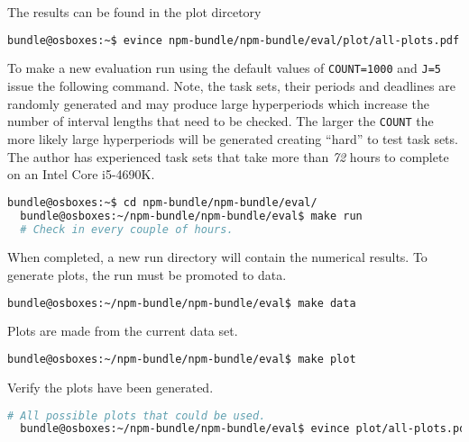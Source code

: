 \documentclass[a4paper]{article}
\begin{document}
{\noindent}The results can be found in the plot dircetory
\begin{lstlisting}[language=bash]
  bundle@osboxes:~$ evince npm-bundle/npm-bundle/eval/plot/all-plots.pdf
\end{lstlisting}

{\noindent}To make a new evaluation run using the default values of
\texttt{COUNT=1000} and \texttt{J=5} issue the following
command. Note, the task sets, their periods and deadlines are randomly
generated and may produce large hyperperiods which increase the number
of interval lengths that need to be checked. The larger the
\texttt{COUNT} the more likely large hyperperiods will be generated
creating ``hard'' to test task sets. The author has experienced task
sets that take more than \emph{72} hours to complete on an Intel Core i5-4690K.

\begin{lstlisting}[language=bash]
  bundle@osboxes:~$ cd npm-bundle/npm-bundle/eval/
  bundle@osboxes:~/npm-bundle/npm-bundle/eval$ make run
  # Check in every couple of hours.
\end{lstlisting}

{\noindent}When completed, a new run directory will contain the
numerical results. To generate plots, the run must be promoted to
data. 

\begin{lstlisting}[language=bash]
  bundle@osboxes:~/npm-bundle/npm-bundle/eval$ make data
\end{lstlisting}

{\noindent}Plots are made from the current data set.
\begin{lstlisting}[language=bash]
  bundle@osboxes:~/npm-bundle/npm-bundle/eval$ make plot
\end{lstlisting}

{\noindent}Verify the plots have been generated.
\begin{lstlisting}[language=bash]
  # All possible plots that could be used.
  bundle@osboxes:~/npm-bundle/npm-bundle/eval$ evince plot/all-plots.pdf
\end{lstlisting}
\end{document}
